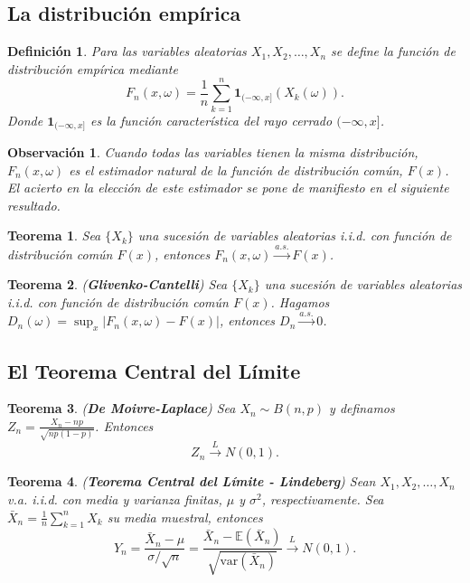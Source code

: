 \documentclass{report}
\newtheorem{thm}{Teorema}[section]
\newtheorem{dfn}{Definición}[section]
\newtheorem{obs}{Observación}[section]
\begin{document}
\subsection{La distribución empírica}

\begin{dfn}
    Para las variables aleatorias $X_1, X_2, \dots, X_n$ se define la función de distribución empírica mediante
    \[
        F_n(x, \omega) = \frac{1}{n} \sum_{k=1}^n \mathbf{1}_{(-\infty,x]}(X_k(\omega)).
        \]
    Donde $ \mathbf{1}_{(-\infty,x]}$ es la función característica del rayo cerrado $(-\infty,x]$.
\end{dfn}

\begin{obs}
    Cuando todas las variables tienen la misma distribución, $F_n(x,\omega)$ es el estimador natural de la función de distribución común, $F(x)$.
    El acierto en la elección de este estimador se pone de manifiesto en el siguiente resultado.
\end{obs}

\begin{thm} \label{thm:empirical_fn_convergence}
Sea $\{X_k\}$ una sucesión de variables aleatorias i.i.d. con función de distribución común $F(x)$, entonces $F_n(x,\omega) \xrightarrow{a.s.} F(x)$.
\end{thm}


\begin{thm} \label{thm:glivenko_cantelli} (\textbf{Glivenko-Cantelli}) Sea $\{X_k\}$ una sucesión de variables aleatorias i.i.d. con función de distribución común $F(x)$. Hagamos $D_n(\omega) = \sup_x |F_n(x,\omega) - F(x)|$, entonces $D_n \xrightarrow{a.s.} 0$.
\end{thm}

\subsection{El Teorema Central del Límite}

\begin{thm} \label{thm:de_moivre_laplace} (\textbf{De Moivre-Laplace}) Sea $X_n \sim B(n,p)$ y definamos $Z_n = \frac{X_n - np}{\sqrt{np(1-p)}}$. Entonces
\[
Z_n \xrightarrow{L} N(0,1).
\]
\end{thm}

\begin{thm} \label{thm:lindeberg} (\textbf{Teorema Central del Límite - Lindeberg}) Sean $X_1, X_2, \dots, X_n$ v.a. i.i.d. con media y varianza finitas, $\mu$ y $\sigma^2$, respectivamente. Sea $\bar{X}_n = \frac{1}{n} \sum_{k=1}^n X_k$ su media muestral, entonces
\[
Y_n = \frac{\bar{X}_n - \mu}{\sigma/\sqrt{n}} = \frac{\bar{X}_n - \mathbb{E}(\bar{X}_n)}{\sqrt{\mathrm{var}(\bar{X}_n)}} \xrightarrow{L} N(0,1).
\]
\end{thm}
\end{document}
